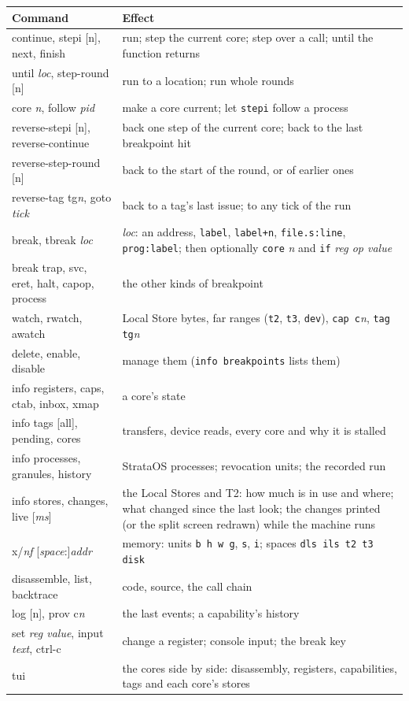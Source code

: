 \begin{center}\small
\begin{tabularx}{\linewidth}{@{}>{\ttfamily}l X@{}}
\toprule
\textrm{\bfseries Command} & \textbf{Effect}\\\midrule
continue, stepi [n], next, finish & run; step the current core; step over a call; until the function returns\\
until \textit{loc}, step-round [n] & run to a location; run whole rounds\\
core \textit{n}, follow \textit{pid} & make a core current; let \texttt{stepi} follow a process\\
reverse-stepi [n], reverse-continue & back one step of the current core; back to the last breakpoint hit\\
reverse-step-round [n] & back to the start of the round, or of earlier ones\\
reverse-tag tg\textit{n}, goto \textit{tick} & back to a tag's last issue; to any tick of the run\\
break, tbreak \textit{loc} & \textit{loc}: an address, \texttt{label}, \texttt{label+n}, \texttt{file.s:line}, \texttt{prog:label}; then optionally \texttt{core} \textit{n} and \texttt{if} \textit{reg op value}\\
break trap, svc, eret, halt, capop, process & the other kinds of breakpoint\\
watch, rwatch, awatch & Local Store bytes, far ranges (\texttt{t2}, \texttt{t3}, \texttt{dev}), \texttt{cap c}\textit{n}, \texttt{tag tg}\textit{n}\\
delete, enable, disable & manage them (\texttt{info breakpoints} lists them)\\
info registers, caps, ctab, inbox, xmap & a core's state\\
info tags [all], pending, cores & transfers, device reads, every core and why it is stalled\\
info processes, granules, history & StrataOS processes; revocation units; the recorded run\\
info stores, changes, live [\textit{ms}] & the Local Stores and T2: how much is in use and where; what changed since the last look; the changes printed (or the split screen redrawn) while the machine runs\\
x/\textit{nf} [\textit{space}:]\textit{addr} & memory: units \texttt{b h w g}, \texttt{s}, \texttt{i}; spaces \texttt{dls ils t2 t3 disk}\\
disassemble, list, backtrace & code, source, the call chain\\
log [n], prov c\textit{n} & the last events; a capability's history\\
set \textit{reg value}, input \textit{text}, ctrl-c & change a register; console input; the break key\\
tui & the cores side by side: disassembly, registers, capabilities, tags and each core's stores\\
\bottomrule
\end{tabularx}
\end{center}

